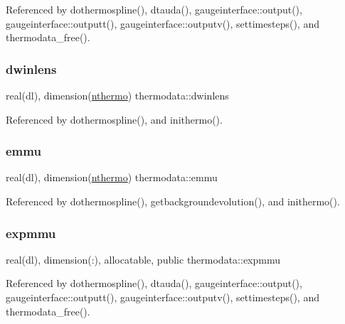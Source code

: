 Referenced by dothermospline(), dtauda(), gaugeinterface\+::output(), gaugeinterface\+::outputt(), gaugeinterface\+::outputv(), settimesteps(), and thermodata\+\_\+free().

\mbox{\label{namespacethermodata_a52362e5ab75ec6515f8b1b142b69ed8a}} 
\subsubsection{\texorpdfstring{dwinlens}{dwinlens}}
{\footnotesize\ttfamily real(dl), dimension(\mbox{\hyperlink{namespacethermodata_ab5a6325bede2b0cce4e867e9e1e18215}{nthermo}}) thermodata\+::dwinlens\hspace{0.3cm}{\ttfamily [private]}}



Referenced by dothermospline(), and inithermo().

\mbox{\label{namespacethermodata_ad1bfdfc33182cbe1182c4785d88011c2}} 
\subsubsection{\texorpdfstring{emmu}{emmu}}
{\footnotesize\ttfamily real(dl), dimension(\mbox{\hyperlink{namespacethermodata_ab5a6325bede2b0cce4e867e9e1e18215}{nthermo}}) thermodata\+::emmu\hspace{0.3cm}{\ttfamily [private]}}



Referenced by dothermospline(), getbackgroundevolution(), and inithermo().

\mbox{\label{namespacethermodata_ab0ba79e6faa7c3d30e4b3a029b832d81}} 
\subsubsection{\texorpdfstring{expmmu}{expmmu}}
{\footnotesize\ttfamily real(dl), dimension(\+:), allocatable, public thermodata\+::expmmu}



Referenced by dothermospline(), dtauda(), gaugeinterface\+::output(), gaugeinterface\+::outputt(), gaugeinterface\+::outputv(), settimesteps(), and thermodata\+\_\+free().

